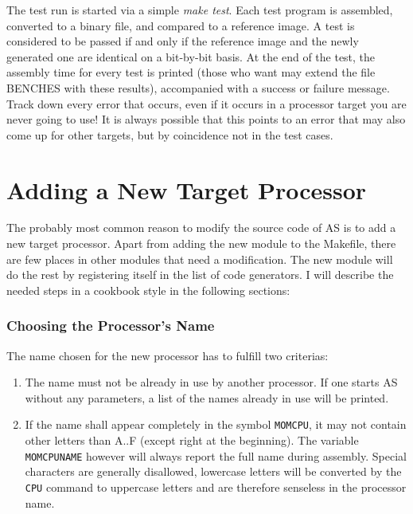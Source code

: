 \documentclass[12pt,twoside]{report}
\newcommand{\tty}[1]{{\tt #1}}
\begin{document}
The test run is started via a simple {\em make test}.  Each test program
is assembled, converted to a binary file, and compared to a reference
image.  A test is considered to be passed if and only if the reference
image and the newly generated one are identical on a bit-by-bit basis.  At
the end of the test, the assembly time for every test is printed (those
who want may extend the file BENCHES with these results), accompanied with
a success or failure message.  Track down every error that occurs, even if
it occurs in a processor target you are never going to use!  It is always
possible that this points to an error that may also come up for other
targets, but by coincidence not in the test cases.


\section{Adding a New Target Processor}

The probably most common reason to modify the source code of AS is to add
a new target processor.   Apart from adding the new module to the
Makefile, there are few places in other modules that need a modification. 
The new module will do the rest by registering itself in the list of code
generators.  I will describe the needed steps in a cookbook style in the
following sections:

\subsubsection{Choosing the Processor's Name}

The name chosen for the new processor has to fulfill two criterias:
\begin{enumerate}
\item{The name must not be already in use by another processor.  If one
      starts AS without any parameters, a list of the names already in
      use will be printed.}
\item{If the name shall appear completely in the symbol \tty{MOMCPU}, it may
      not contain other letters than A..F (except right at the
      beginning).  The variable \tty{MOMCPUNAME} however will always report
      the full name during assembly.  Special characters are generally
      disallowed, lowercase letters will be converted by the \tty{CPU}
      command to uppercase letters and are therefore senseless in the
      processor name.}
\end{enumerate}
\end{document}
